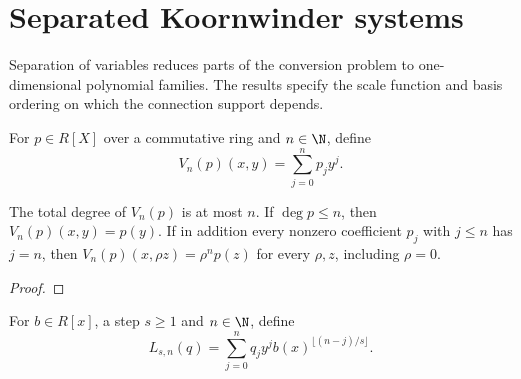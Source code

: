 
\chapter{Separated Koornwinder systems}\label{chap:koornwinder}
Separation of variables reduces parts of the conversion problem to
one-dimensional polynomial families. The results specify the scale function
and basis ordering on which the connection support depends.

\begin{supporting}
\begin{definition}
\label{def:vertical-truncation}
\leanok
For $p\in R[X]$ over a commutative ring and $n\in\N$, define
\[
 V_n(p)(x,y)=\sum_{j=0}^n p_j y^j.
\]

\end{definition}


\begin{theorem}
\label{thm:vertical-truncation}
\leanok
The total degree of $V_n(p)$ is at most $n$. If $\deg p\le n$, then
$V_n(p)(x,y)=p(y)$. If in addition every nonzero coefficient $p_j$ with
$j\le n$ has $j=n$, then
$V_n(p)(x,\rho z)=\rho^n p(z)$ for every $\rho,z$, including $\rho=0$.
\end{theorem}
\begin{proof}
\leanok
\end{proof}

\begin{definition}
\label{def:scaled-koornwinder-lift}
\leanok
For $b\in R[x]$, a step $s\ge1$ and $n\in\N$, define
\[
 L_{s,n}(q)=\sum_{j=0}^n q_j y^j b(x)^{\lfloor(n-j)/s\rfloor}.
\]
\end{definition}


\end{supporting}
